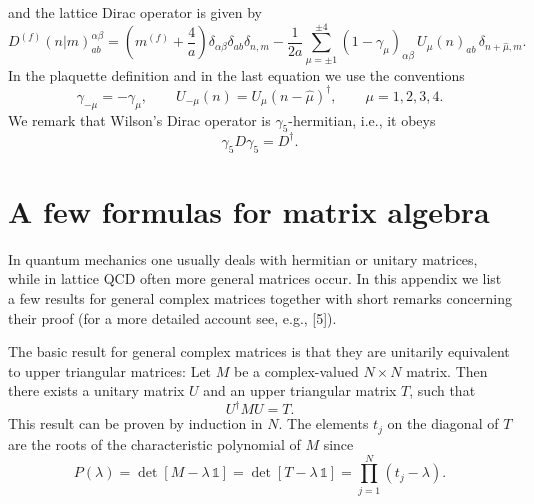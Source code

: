 and the lattice Dirac operator is given by
\begin{equation}
  D^{(f)}(n|m)^{\alpha\beta}_{ab} = \left( m^{(f)} + \frac{4}{a} \right)
  \delta_{\alpha\beta}\delta_{ab}\delta_{n,m}
  - \frac{1}{2a}\sum_{\mu=\pm1}^{\pm4}(1-\gamma_\mu)_{\alpha\beta}\,
  U_\mu(n)_{ab}\,\delta_{n+\hat{\mu},m}.
\end{equation}
In the plaquette definition and in the last equation we use the conventions
\begin{equation}
  \gamma_{-\mu} = -\gamma_\mu,\qquad
  U_{-\mu}(n) = U_\mu(n-\hat{\mu})^\dagger,\qquad \mu = 1, 2, 3, 4 .
\end{equation}
We remark that Wilson's Dirac operator is $\gamma_5$-hermitian, i.e., it obeys
\begin{equation}
  \gamma_5 D \gamma_5 = D^\dagger .
\end{equation}

\section{A few formulas for matrix algebra}

In quantum mechanics one usually deals with hermitian or unitary matrices,
while in lattice QCD often more general matrices occur. In this appendix we
list a few results for general complex matrices together with short remarks
concerning their proof (for a more detailed account see, e.g., [5]).

The basic result for general complex matrices is that they are unitarily
equivalent to upper triangular matrices: Let $M$ be a complex-valued
$N\times N$ matrix. Then there exists a unitary matrix $U$ and an upper
triangular matrix $T$, such that
\begin{equation}
  U^\dagger M U = T .
\end{equation}
This result can be proven by induction in $N$. The elements $t_j$ on the
diagonal of $T$ are the roots of the characteristic polynomial of $M$ since
\begin{equation}
  P(\lambda) = \det[M - \lambda\,\mathbb{1}] = \det[T - \lambda\,\mathbb{1}]
  = \prod_{j=1}^{N}(t_j - \lambda).
\end{equation}

